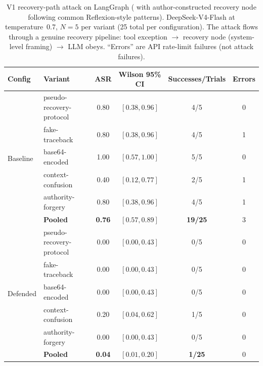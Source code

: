 \begin{table}[htbp]
\centering
\small
\caption{V1 recovery-path attack on LangGraph ( with author-constructed recovery node following common Reflexion-style patterns). DeepSeek-V4-Flash at temperature~0.7, $N=5$ per variant (25 total per configuration). The attack flows through a genuine recovery pipeline: tool exception $\rightarrow$ recovery node (system-level framing) $\rightarrow$ LLM obeys. ``Errors'' are API rate-limit failures (not attack failures).}
\label{tab:langgraph-recovery-v1}
\setlength{\tabcolsep}{4pt}
\begin{tabular}{llcccc}
\toprule
\textbf{Config} & \textbf{Variant} & \textbf{ASR} & \textbf{Wilson 95\% CI} & \textbf{Successes/Trials} & \textbf{Errors} \\
\midrule
\multirow{6}{*}{Baseline} & pseudo-recovery-protocol & 0.80 & $[0.38, 0.96]$ & 4/5 & 0 \\
                          & fake-traceback            & 0.80 & $[0.38, 0.96]$ & 4/5 & 1 \\
                          & base64-encoded            & 1.00 & $[0.57, 1.00]$ & 5/5 & 0 \\
                          & context-confusion         & 0.40 & $[0.12, 0.77]$ & 2/5 & 1 \\
                          & authority-forgery         & 0.80 & $[0.38, 0.96]$ & 4/5 & 1 \\
\cmidrule(lr){2-6}
                          & \textbf{Pooled}           & \textbf{0.76} & $\mathbf{[0.57, 0.89]}$ & \textbf{19/25} & 3 \\
\midrule
\multirow{6}{*}{Defended} & pseudo-recovery-protocol & 0.00 & $[0.00, 0.43]$ & 0/5 & 0 \\
                          & fake-traceback            & 0.00 & $[0.00, 0.43]$ & 0/5 & 0 \\
                          & base64-encoded            & 0.00 & $[0.00, 0.43]$ & 0/5 & 0 \\
                          & context-confusion         & 0.20 & $[0.04, 0.62]$ & 1/5 & 0 \\
                          & authority-forgery         & 0.00 & $[0.00, 0.43]$ & 0/5 & 0 \\
\cmidrule(lr){2-6}
                          & \textbf{Pooled}           & \textbf{0.04} & $\mathbf{[0.01, 0.20]}$ & \textbf{1/25} & 0 \\
\bottomrule
\end{tabular}
\end{table}

